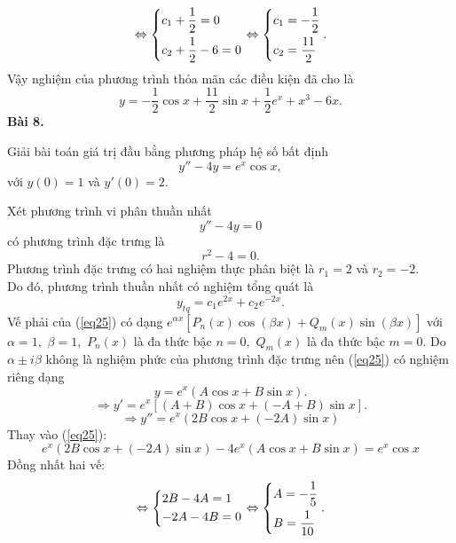 \documentclass[12pt,a4paper]{article}
\begin{document}
\[ \Leftrightarrow \left\{ \begin{gathered}
  {c_1} + \frac{1}{2} = 0 \hfill \\
  {c_2} + \frac{1}{2} - 6 = 0 \hfill \\ 
\end{gathered}  \right. \Leftrightarrow \left\{ \begin{gathered}
  {c_1} =  - \frac{1}{2} \hfill \\
  {c_2} = \frac{{11}}{2} \hfill \\ 
\end{gathered}  \right..\]
Vậy nghiệm của phương trình thỏa mãn các điều kiện đã cho là
\[y =  - \frac{1}{2}\cos x + \frac{{11}}{2}\sin x + \frac{1}{2}{e^x} + {x^3} - 6x.\]
\textbf{Bài 8.}
\begin{mybox}
Giải bài toán giá trị đầu bằng phương pháp hệ số bất định
\begin{equation}
y'' - 4y = {e^x}\cos x,
\label{eq25}
\end{equation}
với \(y\left( 0 \right) = 1\) và \(y'\left( 0 \right) = 2.\)
\end{mybox}
Xét phương trình vi phân thuần nhất
\[y'' - 4y = 0\]
có phương trình đặc trưng là
\[r^2 - 4 = 0.\]
Phương trình đặc trưng có hai nghiệm thực phân biệt là \(r_1 = 2\) và \(r_2 = -2.\) \\
Do đó, phương trình thuần nhất có nghiệm tổng quát là
\[{y_{tq}} = {c_1}{e^{2x}} + {c_2}{e^{ - 2x}}.\]
Vế phải của (\ref{eq25}) có dạng \({e^{\alpha x}}\left[ {{P_n}\left( x \right)\cos \left( {\beta x} \right) + {Q_m}\left( x \right)\sin \left( {\beta x} \right)} \right]\) với \(\alpha  = 1,\) \(\beta  = 1,\) \({P_n}\left( x \right)\) là đa thức bậc \(n = 0,\) \({Q_m}\left( x \right)\) là đa thức bậc \(m = 0.\)
Do \(\alpha  \pm i\beta \) không là nghiệm phức của phương trình đặc trưng nên (\ref{eq25}) có nghiệm riêng dạng
\[y = {e^x}\left( {A\cos x + B\sin x} \right).\]
\[ \Rightarrow y' = {e^x}\left[ {\left( {A + B} \right)\cos x + \left( { - A + B} \right)\sin x} \right].\]
\[ \Rightarrow y'' = {e^x}\left( {2B\cos x + \left( { - 2A} \right)\sin x} \right)\]
Thay vào (\ref{eq25}):
\[{e^x}\left( {2B\cos x + \left( { - 2A} \right)\sin x} \right) - 4{e^x}\left( {A\cos x + B\sin x} \right) = {e^x}\cos x\]
Đồng nhất hai vế:
\[ \Leftrightarrow \left\{ \begin{gathered}
  2B - 4A = 1 \hfill \\
   - 2A - 4B = 0 \hfill \\ 
\end{gathered}  \right. \Leftrightarrow \left\{ \begin{gathered}
  A =  - \frac{1}{5} \hfill \\
  B = \frac{1}{{10}} \hfill \\ 
\end{gathered}  \right..\]
\end{document}
